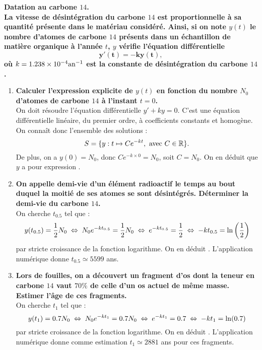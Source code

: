 \documentclass[a4paper, 11pt,reqno]{article}
\begin{document}
\begin{correction} \; \textbf{Datation au carbone $14$.}\\
\textbf{La vitesse de d\'esint\'egration du carbone $14$ est proportionnelle \`a sa quantit\'e pr\'esente dans le mat\'eriau consid\'er\'e. Ainsi, si on note $y(t)$ le nombre d'atomes de carbone $14$ pr\'esents dans un \'echantillon de mati\`ere organique \`a l'ann\'ee $t$, $y$ v\'erifie l'\'equation diff\'erentielle}
$$\mathbf{y'(t) = -k y(t),}$$
\textbf{o\`u $k=1.238 \times 10^{-4} \textmd{an}^{-1}$ est la constante de d\'esint\'egration du carbone $14$.}
\begin{enumerate}
\item \textbf{Calculer l'expression explicite de $y(t)$ en fonction du nombre $N_0$ d'atomes de carbone $14$ \`a l'instant $t=0$.}\\
On doit r\'esoudre l'\'equation diff\'erentielle $y'+ky = 0$.  C'est une \'equation diff\'erentielle lin\'eaire, du premier ordre, \`a coefficients constants et homog\`ene. On conna\^it donc l'ensemble des solutions : 
$$S=\{ y: t \mapsto C e^{-kt}, \textmd{ avec }C \in \mathbb{R}\}.$$
De plus, on a $y(0) = N_0$, donc $C e^{-k\times 0} = N_0$, soit $C=N_0$. On en d\'eduit que $y$ a pour expression .
\item \textbf{On appelle demi-vie d'un \'el\'ement radioactif le temps au bout duquel la moiti\'e de ses atomes se sont d\'esint\'egr\'es. D\'eterminer la demi-vie du carbone $14$.}\\
On cherche $t_{0.5}$ tel que :
$$y(t_{0.5}) = \displaystyle \frac{1}{2} N_0 \; \Leftrightarrow \; N_0 e^{-kt_{0.5}} = \frac{1}{2} N_0 \; \Leftrightarrow \; e^{-kt_{0.5}} = \frac{1}{2} \; \Leftrightarrow \; -kt_{0.5} = \ln\left(\frac{1}{2}\right)$$
par stricte croissance de la fonction logarithme. On en d\'eduit . L'application num\'erique donne $t_{0.5} \simeq 5599$ ans.
\item \textbf{Lors de fouilles, on a d\'ecouvert un fragment d'os dont la teneur en carbone $14$ vaut $70\%$ de celle d'un os actuel de m\^eme masse. Estimer l'\^age de ces fragments.}\\
On cherche $t_1$ tel que :
$$y(t_{1}) = \displaystyle 0.7 N_0 \; \Leftrightarrow \; N_0 e^{-kt_{1}} = 0.7 N_0 \; \Leftrightarrow \; e^{-kt_{1}} = 0.7 \; \Leftrightarrow \; -kt_{1} = \ln(0.7)$$
par stricte croissance de la fonction logarithme. On en d\'eduit . L'application num\'erique donne comme estimation $t_{1} \simeq 2881$ ans pour ces fragments.
\end{enumerate}
\end{correction}
\end{document}
